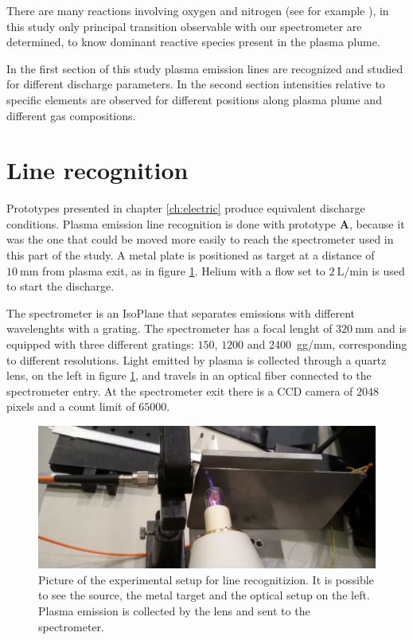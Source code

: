There are many reactions involving oxygen and nitrogen (see for example \cite{Kossyi_1992}), in this study only principal transition observable with our spectrometer are determined, to know dominant reactive species present in the plasma plume.

In the first section of this study plasma emission lines are recognized and studied for different discharge parameters. In the second section intensities relative to specific elements are observed for different positions along plasma plume and different gas compositions. 

\section{Line recognition}
Prototypes presented in chapter \ref{ch:electric} produce equivalent discharge conditions.
Plasma emission line recognition is done with prototype \textbf{A}, because it was the one that could be moved more easily to reach the spectrometer used in this part of the study.
A metal plate is positioned as target at a distance of $\SI{10}{\milli\meter}$ from plasma exit, as in figure \ref{fig:app1}. Helium with a flow set to $\SI{2}{\liter/\minute}$ is used to start the discharge.

The spectrometer is an IsoPlane that separates emissions with different wavelenghts with a grating. The spectrometer has a focal lenght of $\SI{320}{\milli\meter}$ and is equipped with three different gratings: $\num{150}$, $\num{1200}$ and \SI{2400}{gg/\milli\meter}, corresponding to different resolutions. %
Light emitted by plasma is collected through a quartz lens, on the left in  figure \ref{fig:app1},%
and travels in an optical fiber %
connected to the spectrometer entry. At the spectrometer exit there is a CCD camera of $2048$ pixels and a count limit of $\num{65000}$.
\begin{figure}
\centering
\includegraphics[width=.6\textwidth]{Images/Spectroscopy/apparato.jpg}
\caption{Picture of the experimental setup for line recognitizion. It is possible to see the source, the metal target and the optical setup on the left. Plasma emission is collected by the lens and sent to the spectrometer.}
\label{fig:app1}
\end{figure}

